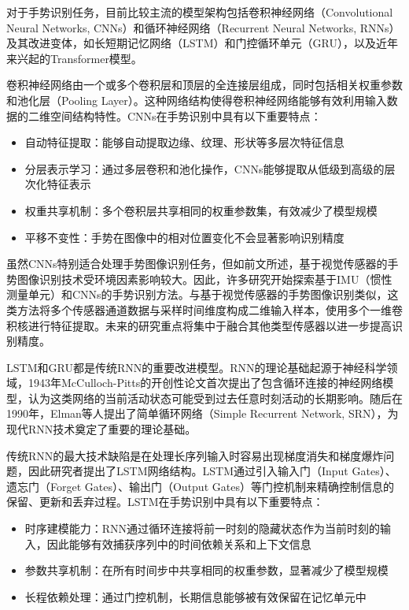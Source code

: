 对于手势识别任务，目前比较主流的模型架构包括卷积神经网络（Convolutional Neural Networks, CNNs）和循环神经网络（Recurrent Neural Networks, RNNs）及其改进变体，如长短期记忆网络（LSTM）和门控循环单元（GRU），以及近年来兴起的Transformer模型。

卷积神经网络由一个或多个卷积层和顶层的全连接层组成，同时包括相关权重参数和池化层（Pooling Layer）。这种网络结构使得卷积神经网络能够有效利用输入数据的二维空间结构特性\cite{wiki:convolutional_neural_network}。CNNs在手势识别中具有以下重要特点\cite{wu2024gesture}：
\begin{itemize}
    \item 自动特征提取：能够自动提取边缘、纹理、形状等多层次特征信息
    \item 分层表示学习：通过多层卷积和池化操作，CNNs能够提取从低级到高级的层次化特征表示
    \item 权重共享机制：多个卷积层共享相同的权重参数集，有效减少了模型规模
    \item 平移不变性：手势在图像中的相对位置变化不会显著影响识别精度
\end{itemize}

虽然CNNs特别适合处理手势图像识别任务，但如前文所述，基于视觉传感器的手势图像识别技术受环境因素影响较大。因此，许多研究开始探索基于IMU（惯性测量单元）和CNNs的手势识别方法\cite{karnerrealtime, dahiya2024efficient,sakuma2022mlp}。与基于视觉传感器的手势图像识别类似，这类方法将多个传感器通道数据与采样时间维度构成二维输入样本，使用多个一维卷积核进行特征提取。未来的研究重点将集中于融合其他类型传感器以进一步提高识别精度\cite{dahiya2024efficient}。

LSTM和GRU都是传统RNN的重要改进模型。RNN的理论基础起源于神经科学领域，1943年McCulloch-Pitts的开创性论文首次提出了包含循环连接的神经网络模型，认为这类网络的当前活动状态可能受到过去任意时刻活动的长期影响。随后在1990年，Elman等人\cite{elman1990finding}提出了简单循环网络（Simple Recurrent Network, SRN），为现代RNN技术奠定了重要的理论基础。

传统RNN的最大技术缺陷是在处理长序列输入时容易出现梯度消失和梯度爆炸问题，因此研究者提出了LSTM网络结构\cite{hochreiter1997long}。LSTM通过引入输入门（Input Gates）、遗忘门（Forget Gates）、输出门（Output Gates）等门控机制来精确控制信息的保留、更新和丢弃过程。LSTM在手势识别中具有以下重要特点\cite{wu2024gesture}：
\begin{itemize}
    \item 时序建模能力：RNN通过循环连接将前一时刻的隐藏状态作为当前时刻的输入，因此能够有效捕获序列中的时间依赖关系和上下文信息
    \item 参数共享机制：在所有时间步中共享相同的权重参数，显著减少了模型规模
    \item 长程依赖处理：通过门控机制，长期信息能够被有效保留在记忆单元中
\end{itemize}

